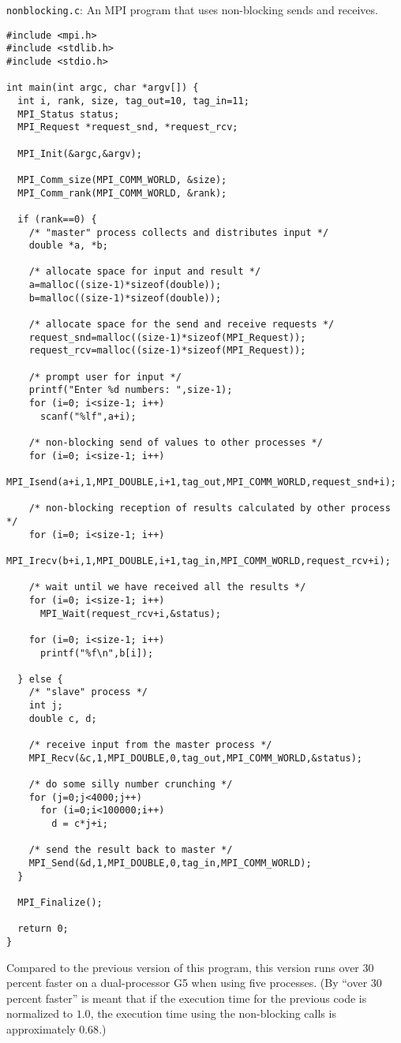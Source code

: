 \begin{program}
{\tt nonblocking.c}: An MPI program that uses non-blocking sends and
receives. \label{pro:nonblocking}
\codemiddle
\begin{lstlisting}
#include <mpi.h>
#include <stdlib.h>
#include <stdio.h>

int main(int argc, char *argv[]) {
  int i, rank, size, tag_out=10, tag_in=11;
  MPI_Status status;
  MPI_Request *request_snd, *request_rcv;
  
  MPI_Init(&argc,&argv);
  
  MPI_Comm_size(MPI_COMM_WORLD, &size);
  MPI_Comm_rank(MPI_COMM_WORLD, &rank);

  if (rank==0) {
    /* "master" process collects and distributes input */
    double *a, *b;

    /* allocate space for input and result */
    a=malloc((size-1)*sizeof(double));
    b=malloc((size-1)*sizeof(double));

    /* allocate space for the send and receive requests */
    request_snd=malloc((size-1)*sizeof(MPI_Request));
    request_rcv=malloc((size-1)*sizeof(MPI_Request));

    /* prompt user for input */
    printf("Enter %d numbers: ",size-1);
    for (i=0; i<size-1; i++)
      scanf("%lf",a+i);

    /* non-blocking send of values to other processes */
    for (i=0; i<size-1; i++)
      MPI_Isend(a+i,1,MPI_DOUBLE,i+1,tag_out,MPI_COMM_WORLD,request_snd+i);

    /* non-blocking reception of results calculated by other process */
    for (i=0; i<size-1; i++)
      MPI_Irecv(b+i,1,MPI_DOUBLE,i+1,tag_in,MPI_COMM_WORLD,request_rcv+i);

    /* wait until we have received all the results */
    for (i=0; i<size-1; i++)
      MPI_Wait(request_rcv+i,&status);

    for (i=0; i<size-1; i++)
      printf("%f\n",b[i]);

  } else {
    /* "slave" process */
    int j;
    double c, d;

    /* receive input from the master process */
    MPI_Recv(&c,1,MPI_DOUBLE,0,tag_out,MPI_COMM_WORLD,&status);
    
    /* do some silly number crunching */
    for (j=0;j<4000;j++)
      for (i=0;i<100000;i++)
        d = c*j+i;
    
    /* send the result back to master */
    MPI_Send(&d,1,MPI_DOUBLE,0,tag_in,MPI_COMM_WORLD);
  }
  
  MPI_Finalize();
  
  return 0;
}
\end{lstlisting}
\end{program}

Compared to the previous version of this program, this version runs
over $30$ percent faster on a dual-processor G5 when using five
processes.  (By ``over $30$ percent faster'' is meant that if the
execution time for the previous code is normalized to $1.0$, the
execution time using the non-blocking calls is approximately
$0.68$.)

